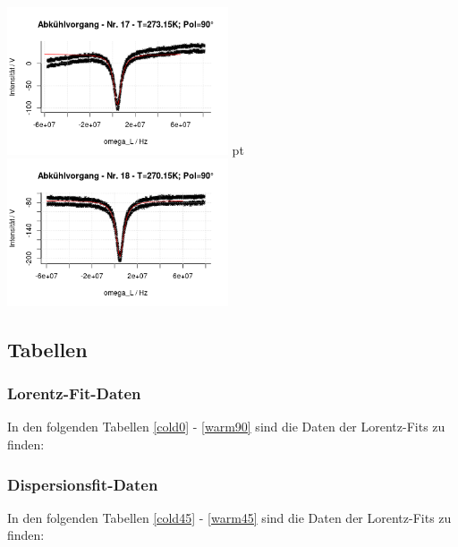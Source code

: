 \documentclass[12pt]{article}
\begin{document}
\begin{minipage}[h!]{\textwidth}
		\includegraphics[width=0.49\textwidth]{figures/cold90-17.png} pt	\includegraphics[width=0.49\textwidth]{figures/cold90-18.png}\vskip -10pt
	\end{minipage}
	\clearpage

\subsection{Tabellen}\label{tabellen}

\subsubsection{Lorentz-Fit-Daten\label{LD}}

In den folgenden Tabellen \ref{cold0} - \ref{warm90} sind die Daten der Lorentz-Fits zu finden:







\subsubsection{Dispersionsfit-Daten\label{DD}}
In den folgenden Tabellen \ref{cold45} - \ref{warm45} sind die Daten der Lorentz-Fits zu finden:


%
\end{document}
